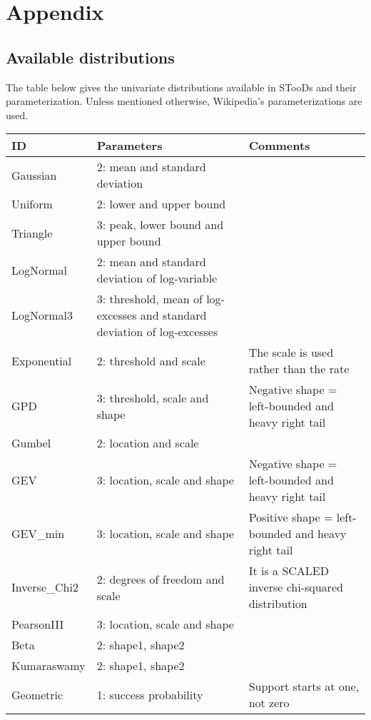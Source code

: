 \documentclass[a4paper]{article}
\begin{document}
	\section{Appendix}
	
	\subsection{Available distributions} \label{distributions}
	
	The table below gives the univariate distributions available in STooDs and their parameterization. Unless mentioned otherwise, Wikipedia's parameterizations are used.
	
	\begin{tabular}{|p{2.5cm}|p{7.5cm}|p{6cm}|}
		\hline
		\textbf{ID} & \textbf{Parameters}  & \textbf{Comments} \\
		\hline
		Gaussian & 2: mean and standard deviation  &  \\
		\hline
		Uniform & 2: lower and upper bound &  \\
		\hline
		Triangle & 3: peak, lower bound and upper bound  &  \\
		\hline
		LogNormal & 2: mean and standard deviation of log-variable &  \\
		\hline
		LogNormal3 & 3: threshold, mean of log-excesses and standard deviation of log-excesses  &  \\
		\hline
		Exponential & 2: threshold and scale & The scale is used rather than the rate \\
		\hline
		GPD & 3: threshold, scale and shape & Negative shape = left-bounded and heavy right tail \\
		\hline
		Gumbel & 2: location and scale &  \\
		\hline
		GEV & 3: location, scale and shape & Negative shape = left-bounded and heavy right tail \\
		\hline
		GEV\_min &  3: location, scale and shape & Positive shape = left-bounded and heavy right tail \\
		\hline
		Inverse\_Chi2 & 2: degrees of freedom and scale  &  It is a SCALED inverse chi-squared distribution \\
		\hline
		PearsonIII & 3: location, scale and shape  &  \\
		\hline
		Beta & 2: shape1, shape2 &  \\
		\hline
		Kumaraswamy & 2: shape1, shape2 &  \\
		\hline
		Geometric & 1: success probability & Support starts at one, not zero \\

\end{tabular}
\end{document}
